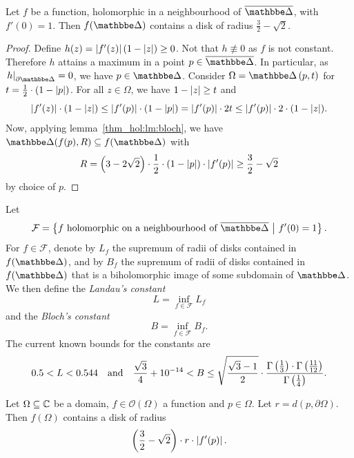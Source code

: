 \begin{izrek}[Bloch]
Let $f$ be a function, holomorphic in a neighbourhood of
$\oline{\dsk}$, with $f'(0) = 1$. Then $f(\dsk)$ contains a disk of
radius $\frac{3}{2} - \sqrt{2}$.
\end{izrek}


\begin{proof}
Define $h(z) = \left\lvert f'(z)\right\rvert (1-\left\lvert z\right\rvert) \geq 0$. Not that
$h \not \equiv 0$ as $f$ is not constant. Therefore $h$ attains a
maximum in a point $p \in \oline{\dsk}$. In particular, as
$\eval{h}{\partial \dsk}{} = 0$, we have $p \in \dsk$. Consider
$\Omega = \dsk \br{p, t}$ for
$t = \frac{1}{2} \cdot (1 - \left\lvert p\right\rvert)$.
For all $z \in \Omega$, we have $1 - \left\lvert z\right\rvert \geq t$ and
\[
\left\lvert f'(z)\right\rvert \cdot (1 - \left\lvert z\right\rvert) \leq
\left\lvert f'(p)\right\rvert \cdot (1 - \left\lvert p\right\rvert) =
\left\lvert f'(p)\right\rvert \cdot 2t \leq
\left\lvert f'(p)\right\rvert \cdot 2 \cdot (1 - \left\lvert z\right\rvert).
\]
Now, applying lemma~\ref{thm_hol:lm:bloch}, we have
$\dsk(f(p), R) \subseteq f(\dsk)$ with
\[
R =
\left(3 - 2 \sqrt{2}\right) \cdot \frac{1}{2}
\cdot (1 - \left\lvert p\right\rvert) \cdot \left\lvert f'(p)\right\rvert \geq
\frac{3}{2} - \sqrt{2}
\]
by choice of $p$.
\end{proof}

\begin{opomba}
Let
\[
\mathcal{F} =
\setb{\text{$f$ holomorphic on a neighbourhood of $\oline{\dsk}$}}
{f'(0) = 1}.
\]
For $f \in \mathcal{F}$, denote by $L_f$ the supremum of radii of
disks contained in $f(\dsk)$, and by $B_f$ the supremum of radii of
disks contained in $f(\dsk)$ that is a biholomorphic image of some
subdomain of $\dsk$. We then define the \emph{Landau's constant}
\[
L = \inf_{f \in \mathcal{F}} L_f
\]
and the \emph{Bloch's constant}
\[
B = \inf_{f \in \mathcal{F}} B_f.
\]
The current known bounds for the constants are
\[
0.5 < L < 0.544
\quad \text{and} \quad
\frac{\sqrt{3}}{4} + 10^{-14} < B \leq
\sqrt{\frac{\sqrt{3} - 1}{2}} \cdot
\frac{\Gamma \left(\frac{1}{3}\right) \cdot \Gamma \left(\frac{11}{12}\right)}
{\Gamma \left(\frac{1}{4}\right)}.
\]
\end{opomba}

\begin{posledica}
\label{thm_hol:cor:bloch}
Let $\Omega \subseteq \mathbb{C}$ be a domain, $f \in \mathcal{O}(\Omega)$
a function and $p \in \Omega$. Let $r = d(p, \partial \Omega)$.
Then $f(\Omega)$ contains a disk of radius
\[
\left(\frac{3}{2} - \sqrt{2}\right) \cdot r \cdot \left\lvert f'(p)\right\rvert.
\]
\end{posledica}

\obvs

